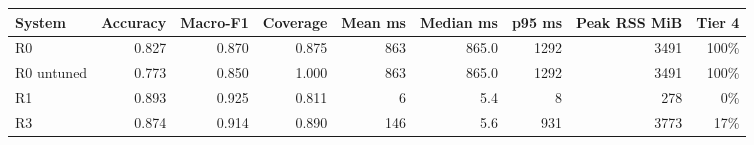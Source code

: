 \begin{tabular}{lrrrrrrrr}
\toprule
System & Accuracy & Macro-F1 & Coverage & Mean ms & Median ms & p95 ms & Peak RSS MiB & Tier 4 \\
\midrule
R0 & 0.827 & 0.870 & 0.875 & 863 & 865.0 & 1292 & 3491 & 100\% \\
R0 untuned & 0.773 & 0.850 & 1.000 & 863 & 865.0 & 1292 & 3491 & 100\% \\
R1 & 0.893 & 0.925 & 0.811 & 6 & 5.4 & 8 & 278 & 0\% \\
R3 & 0.874 & 0.914 & 0.890 & 146 & 5.6 & 931 & 3773 & 17\% \\
\bottomrule
\end{tabular}

